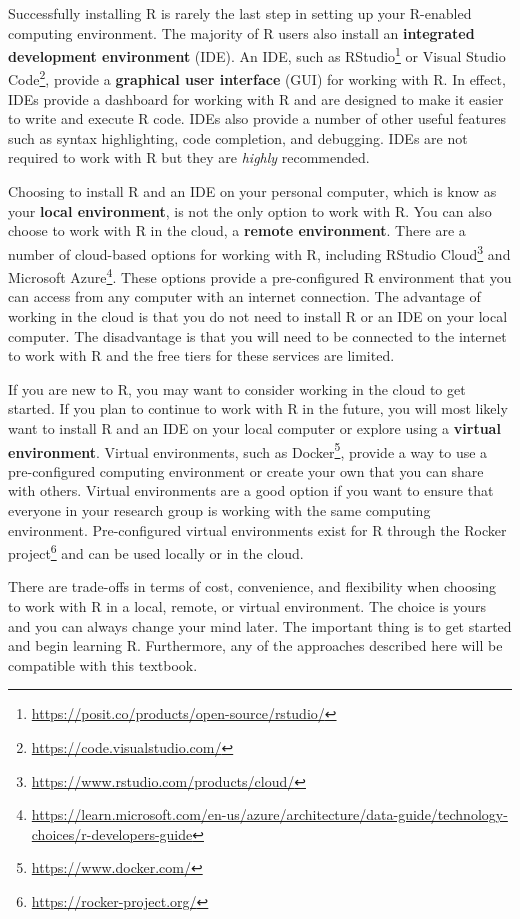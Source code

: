 \documentclass[
  letterpaper,
  DIV=11,
  numbers=noendperiod]{scrreport}
\theoremstyle{definition}
\theoremstyle{remark}
\DeclareRobustCommand{\href}[2]{#2\footnote{\url{#1}}}
\begin{document}
Successfully installing R is rarely the last step in setting up your
R-enabled computing environment. The majority of R users also install an
\textbf{integrated development environment} (IDE). An IDE, such as
\href{https://posit.co/products/open-source/rstudio/}{RStudio} or
\href{https://code.visualstudio.com/}{Visual Studio Code}, provide a
\textbf{graphical user interface} (GUI) for working with R. In effect,
IDEs provide a dashboard for working with R and are designed to make it
easier to write and execute R code. IDEs also provide a number of other
useful features such as syntax highlighting, code completion, and
debugging. IDEs are not required to work with R but they are
\emph{highly} recommended.

Choosing to install R and an IDE on your personal computer, which is
know as your \textbf{local environment}, is not the only option to work
with R. You can also choose to work with R in the cloud, a
\textbf{remote environment}. There are a number of cloud-based options
for working with R, including
\href{https://www.rstudio.com/products/cloud/}{RStudio Cloud} and
\href{https://learn.microsoft.com/en-us/azure/architecture/data-guide/technology-choices/r-developers-guide}{Microsoft
Azure}. These options provide a pre-configured R environment that you
can access from any computer with an internet connection. The advantage
of working in the cloud is that you do not need to install R or an IDE
on your local computer. The disadvantage is that you will need to be
connected to the internet to work with R and the free tiers for these
services are limited.

If you are new to R, you may want to consider working in the cloud to
get started. If you plan to continue to work with R in the future, you
will most likely want to install R and an IDE on your local computer or
explore using a \textbf{virtual environment}. Virtual environments, such
as \href{https://www.docker.com/}{Docker}, provide a way to use a
pre-configured computing environment or create your own that you can
share with others. Virtual environments are a good option if you want to
ensure that everyone in your research group is working with the same
computing environment. Pre-configured virtual environments exist for R
through the \href{https://rocker-project.org/}{Rocker project} and can
be used locally or in the cloud.

There are trade-offs in terms of cost, convenience, and flexibility when
choosing to work with R in a local, remote, or virtual environment. The
choice is yours and you can always change your mind later. The important
thing is to get started and begin learning R. Furthermore, any of the
approaches described here will be compatible with this textbook.
\end{document}

